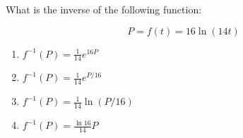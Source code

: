 \bigskip

\item What is the inverse of the following function:

$$
P = f(t) = 16 \ln(14 t)
$$

\begin{enumerate}
\item $ f^{-1}(P) = \frac{1}{14} e^{16P}$
\item $ f^{-1}(P) = \frac{1}{14} e^{P/16}$
\item $ f^{-1}(P) = \frac{1}{14} \ln(P/16)$
\item $ f^{-1}(P) = \frac{\ln 16}{14} P$
\end{enumerate}

